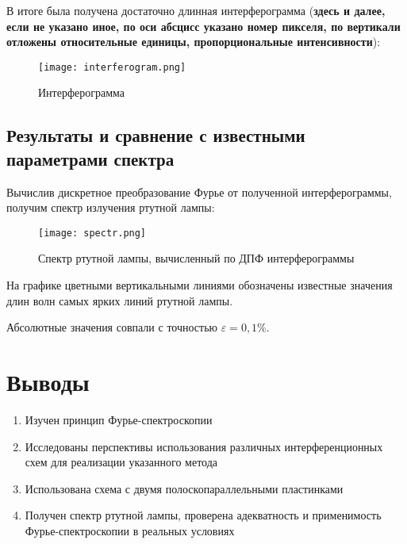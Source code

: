 \documentclass{urticle}
\begin{document}
  
	
	
	В итоге была получена достаточно длинная интерферограмма (\textbf{здесь и далее, если не указано иное, по оси абсцисс указано номер пикселя, по вертикали отложены относительные единицы, пропорциональные интенсивности}):
	\begin{figure}[H]
	\centering
  	\texttt{[image: interferogram.png]}
  \caption{Интерферограмма}
\end{figure}

\newpage
	\subsection*{Результаты и сравнение с известными параметрами спектра}
	
	Вычислив дискретное преобразование Фурье от полученной интерферограммы, получим спектр излучения ртутной лампы:
	
	\begin{figure}[H]
	\centering
  	\texttt{[image: spectr.png]}
  \caption{Спектр ртутной лампы, вычисленный по ДПФ интерферограммы}
  \end{figure}
  На графике цветными вертикальными линиями обозначены известные значения длин волн самых ярких линий ртутной лампы.
  
  Абсолютные значения совпали с точностью $\varepsilon = 0,1\%$.

	
\section*{Выводы}
\begin{enumerate}
	\item Изучен принцип Фурье-спектроскопии
	\item Исследованы перспективы использования различных интерференционных схем для реализации указанного метода
	\item Использована схема с двумя полоскопараллельными пластинками
	\item Получен спектр ртутной лампы, проверена адекватность и применимость Фурье-спектроскопии в реальных условиях
\end{enumerate}
\end{document}
